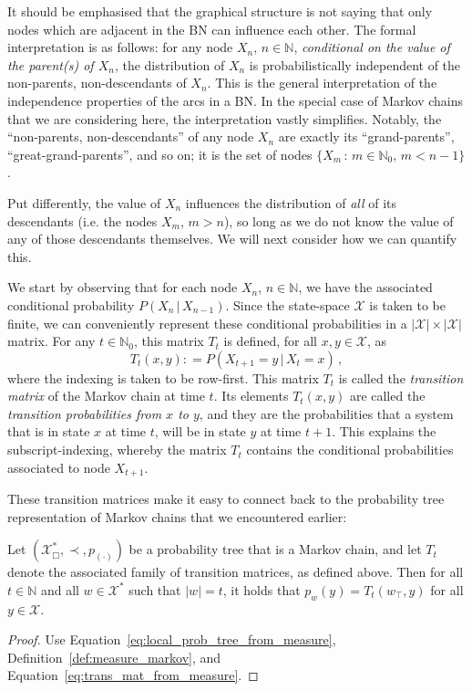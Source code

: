 \documentclass[graybox]{svmult}
\newcommand{\nats}{\mathbb{N}}
\newcommand{\natswith}{\nats_{0}}
\newcommand{\states}{\mathcal{X}}
\newcommand{\coloneqq}{:\!=}
\begin{document}
It should be emphasised that the graphical structure is not saying that only nodes which are adjacent in the BN can influence each other. The formal interpretation is as follows: for any node $X_n$, $n\in\nats$, \emph{conditional on the value of the parent(s) of $X_n$}, the distribution of $X_n$ is probabilistically independent of the non-parents, non-descendants of $X_n$. This is the general interpretation of the independence properties of the arcs in a BN. In the special case of Markov chains that we are considering here, the interpretation vastly simplifies. Notably, the ``non-parents, non-descendants'' of any node $X_n$ are exactly its ``grand-parents'', ``great-grand-parents'', and so on; it is the set of nodes $\{X_{m}\,:\,m\in\natswith,\, m<n-1\}$.

Put differently, the value of $X_n$ influences the distribution of \emph{all} of its descendants (i.e. the nodes $X_m$, $m>n$), so long as we do not know the value of any of those descendants themselves. We will next consider how we can quantify this.

We start by observing that for each node $X_n$, $n\in\nats$, we have the associated conditional probability $P(X_n\,\vert\,X_{n-1})$. Since the state-space $\states$ is taken to be finite, we can conveniently represent these conditional probabilities in a $\lvert\states\rvert\times\lvert\states\rvert$ matrix. For any $t\in\natswith$, this matrix $T_t$ is defined, for all $x,y\in\states$, as
\begin{equation}\label{eq:trans_mat_from_measure}
T_t(x,y) \coloneqq P(X_{t+1}=y\,\vert\,X_t=x)\,,
\end{equation}
where the indexing is taken to be row-first. This matrix $T_t$ is called the \emph{transition matrix} of the Markov chain at time $t$. Its elements $T_t(x,y)$ are called the \emph{transition probabilities from $x$ to $y$}, and they are the probabilities that a system that is in state $x$ at time $t$, will be in state $y$ at time $t+1$. This explains the subscript-indexing, whereby the matrix $T_t$ contains the conditional probabilities associated to node $X_{t+1}$.

These transition matrices make it easy to connect back to the probability tree representation of Markov chains that we encountered earlier:
\begin{proposition}
Let $(\states^*_\Box,\prec,p_{(\cdot)})$ be a probability tree that is a Markov chain, and let $T_t$ denote the associated family of transition matrices, as defined above. Then for all $t\in\nats$ and all $w\in\states^*$ such that $\lvert w\rvert = t$, it holds that $p_w(y)=T_t(w_\top, y)$ for all $y\in\states$.
\end{proposition}
\begin{proof}
Use Equation~\eqref{eq:local_prob_tree_from_measure}, Definition~\ref{def:measure_markov}, and Equation~\eqref{eq:trans_mat_from_measure}.
\end{proof}
\end{document}
